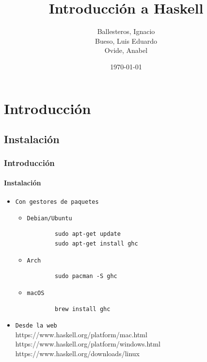 \documentclass{beamer}
\title{Introducción a Haskell}
\subtitle{}
\date{\today}
\author{Ballesteros, Ignacio\\Bueso, Luis Eduardo\\Ovide, Anabel}
\institute{\url{https://github.com/edububa/haskell_course}}
\begin{document}
\maketitle


\section{Introducción}
\subsection{Instalación}
\begin{frame}[fragile]
  \frametitle{Introducción}
  \framesubtitle{Instalación}
  \begin{itemize}
  \item\texttt{Con gestores de paquetes}

    \begin{itemize}
    \item\texttt{Debian/Ubuntu}
      \begin{verbatim}
        sudo apt-get update
        sudo apt-get install ghc
      \end{verbatim}

    \item\texttt{Arch}
      \begin{verbatim}
        sudo pacman -S ghc
      \end{verbatim}

    \item\texttt{macOS}
      \begin{verbatim}
        brew install ghc
      \end{verbatim}
    \end{itemize}
  \item\texttt{Desde la web}\\
    https://www.haskell.org/platform/mac.html\\
    https://www.haskell.org/platform/windows.html\\
    https://www.haskell.org/downloads/linux
  \end{itemize}
\end{frame}
\end{document}
